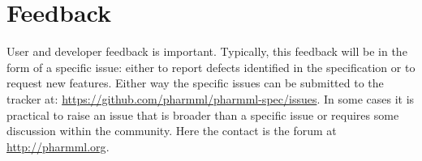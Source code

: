 \section{Feedback}

User and developer feedback is important. Typically,
this feedback will be in the form of a specific issue: either to report defects identified in
the specification or to request new features. Either way the specific issues can be submitted
to the tracker at: \url{https://github.com/pharmml/pharmml-spec/issues}. In some cases it is practical to raise
an issue that is broader than a specific issue or requires some discussion within the community. 
Here the contact is the \pharmml forum at \url{http://pharmml.org}.
